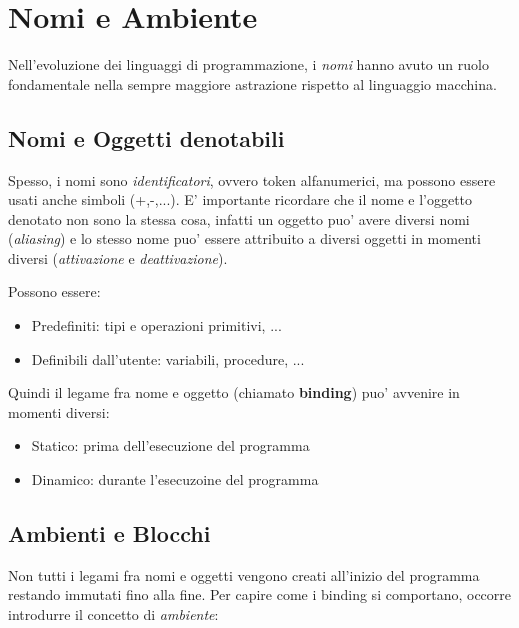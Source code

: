 % 
\chapter{Nomi e Ambiente}

Nell'evoluzione dei linguaggi di programmazione, i \textit{nomi} hanno avuto un ruolo fondamentale nella sempre maggiore astrazione rispetto al linguaggio macchina. 


\section{Nomi e Oggetti denotabili}

Spesso, i nomi sono \textit{identificatori}, ovvero token alfanumerici, ma possono essere usati anche simboli (+,-,...). E' importante ricordare che il nome e l'oggetto denotato non sono la stessa cosa, infatti un oggetto puo' avere diversi nomi (\textit{aliasing}) e lo stesso nome puo' essere attribuito a diversi oggetti in momenti diversi (\textit{attivazione} e \textit{deattivazione}).  


Possono essere:
\begin{itemize}
\item Predefiniti: tipi e operazioni primitivi, ...
  \item Definibili dall'utente: variabili, procedure, ...
\end{itemize}

Quindi il legame fra nome e oggetto (chiamato \textbf{binding}) puo' avvenire in momenti diversi:
\begin{itemize}
\item Statico: prima dell'esecuzione del programma
\item Dinamico: durante l'esecuzoine del programma
\end{itemize}

\section{Ambienti e Blocchi}

Non tutti i legami fra nomi e oggetti vengono creati all'inizio del programma restando immutati fino alla fine. Per capire come i binding si comportano, occorre introdurre il concetto di \textit{ambiente}:

